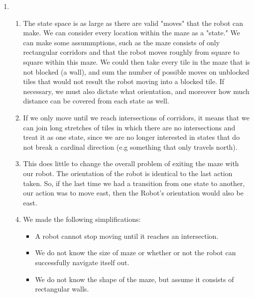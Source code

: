 \documentclass{article}
\begin{document}
\begin{enumerate}
    \item %
    \begin{enumerate}
        \item %
        The state space is as large as there are valid "moves" that the robot can make. We can consider every location within the maze as a "state." We can make some assummptions, such as the maze consists of only rectangular corridors and that the robot moves roughly from square to square within this maze. We could then take every tile in the maze that is not blocked (a wall), and sum the number of possible moves on unblocked tiles that would not result the robot moving into a blocked tile. If necessary, we must also dictate what orientation, and moreover how much distance can be covered from each state as well.
        \item %
        If we only move until we reach intersections of corridors, it means that we can join long stretches of  tiles in which there are no intersections and treat it as one state, since we are no longer interested in states that do not break a cardinal direction (e.g something that only travels north).
        \item %
        This does little to change the overall problem of exiting the maze with our robot. The orientation of the robot is identical to the last action taken. So, if the last time we had a transition from one state to another, our action was to move east, then the Robot's orientation would also be east.
        \item %
        We made the following simplifications:
        \begin{itemize}
            \item
            A robot cannot stop moving until it reaches an intersection.
            \item
            We do not know the size of maze or whether or not the robot can successfully navigate itself out.
            \item
            We do not know the shape of the maze, but assume it consists of rectangular walls.
        \end{itemize}


\end{enumerate}
\end{enumerate}
\end{document}
